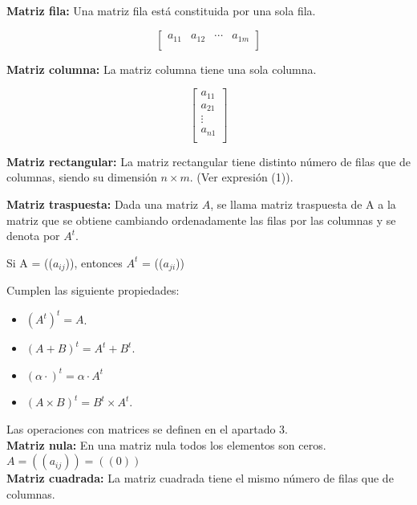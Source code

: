 \noindent\textbf{Matriz fila:} Una matriz fila está constituida por una sola fila.

\[\begin{bmatrix}
a_{11} & a_{12} & \cdots & a_{1m} \\
\end{bmatrix}\]

\noindent\textbf{Matriz columna:} La matriz columna tiene una sola columna.

\[\begin{bmatrix}
a_{11} \\
a_{21} \\
\vdots \\
a_{n1} \\
\end{bmatrix}\]

\textbf{Matriz rectangular:} La matriz rectangular tiene distinto número de filas que de columnas, siendo su dimensión $n\times {m}$. (Ver expresión (1)).

\textbf{Matriz traspuesta:} Dada una matriz $A$, se llama matriz traspuesta de A a la matriz que se obtiene cambiando ordenadamente las filas por las columnas y se denota por $A^t$.

Si A = (($a_{ij}$)), entonces $A^t$ = (($a_{ji}$))

Cumplen las siguiente propiedades:

\begin{itemize}
\item $(A^t)^t = A$.
\item $(A + B)^t = A^t + B^t$.
\item $(\alpha \cdot )^t = \alpha \cdot {A^t}$
\item $(A\times B)^t = B^t\times A^t$.
\end{itemize}
Las operaciones con matrices se definen en el apartado 3. \\


\textbf{Matriz nula:} En una matriz nula todos los elementos son ceros. $A = ((a_{ij})) = ((0))$ \\

\textbf{Matriz cuadrada:} La matriz cuadrada tiene el mismo número de filas que de columnas.


